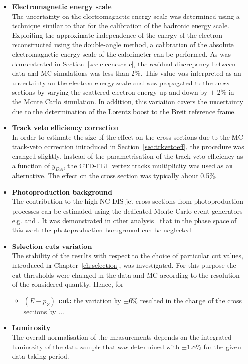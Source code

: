 \begin{itemize}
	\item \textbf{Electromagnetic energy scale}\\
		The uncertainty on the electromagnetic energy scale was determined using a technique similar to that for the calibration of the hadronic energy scale. Exploiting the approximate independence of the energy of the electron reconstructed using the double-angle method, a calibration of the absolute electromagnetic energy scale of the calorimeter can be performed. As was demonstrated in Section~\ref{sec:eleenescale}, the residual discrepancy between data and MC simulations was less than 2\%. This value was interpreted as an uncertainty on the electron energy scale and was propagated to the cross sections by varying the scattered electron energy up and down by $\pm$ 2\% in the Monte Carlo simulation. In addition, this variation covers the uncertainty due to the determination of the Lorentz boost to the Breit reference frame. 
	
	\item \textbf{Track veto efficiency correction}\\
		In order to estimate the size of the effect on the cross sections due to the MC track-veto correction introduced in Section~\ref{sec:trkvetoeff}, the procedure was changed slightly. Instead of the parametrisation of the track-veto efficiency as a function of $y_{DA}$, the CTD-FLT vertex tracks multiplicity was used as an alternative. The effect on the cross section was typically about 0.5\%.
	
	\item \textbf{Photoproduction background}\\
		The contribution to the high-\qsq NC DIS jet cross sections from photoproduction processes can be estimated using the dedicated Monte Carlo event generators e.g. \pythia and \herwig. It was demonstrated in other analysis~\cite{thesis:januschek:2011,thesis:stewart:2012} that in the phase space of this work the photoproduction background can be neglected.
	
	\item \textbf{Selection cuts variation} \\
		The stability of the results with respect to the choice of particular cut values, introduced in Chapter~\ref{ch:selection}, was investigated. For this purpose the cut thresholds were changed in the data and MC according to the resolution of the considered quantity. Hence, for 
		\begin{itemize}
			\item \textbf{$\left( E-p_Z\right) $ cut:} the variation by $\pm6\%$ resulted in the change of the cross sections by ...
		\end{itemize}
	\item \textbf{Luminosity} \\
		The overall normalisation of the measurements depends on the integrated luminosity of the data sample that was determined with $\pm1.8\%$ for the given data-taking period.
\end{itemize}
